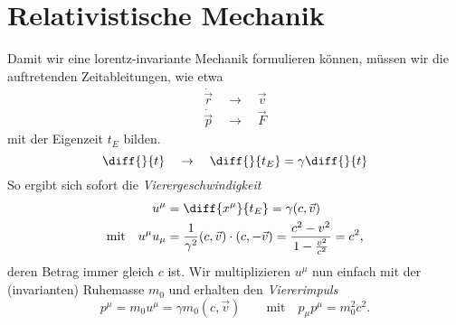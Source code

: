 \section{Relativistische Mechanik}

Damit wir eine lorentz-invariante Mechanik formulieren können, müssen wir die auftretenden Zeitableitungen, wie etwa
\begin{align*}
\dot{\vec{r}} \quad \rightarrow \quad \vec{v}\\
\dot{\vec{p}}\quad\rightarrow\quad\vec{F}
\end{align*}
mit der Eigenzeit $t_E$ bilden. 
\begin{equation*}
\diff{}{t}\quad\rightarrow\quad\diff{}{t_E}=\gamma\diff{}{t}
\end{equation*}
So ergibt sich sofort die \emph{Vierergeschwindigkeit}
\begin{align*}
u^\mu &= \diff{x^\mu}{t_E} = \gamma(c,\vec{v})\\
\text{mit}\quad u^\mu u_\mu &= \frac{1}{\gamma^2}(c,\vec{v})\cdot (c,-\vec{v}) = \frac{c^2-v^2}{1-\frac{v^2}{c^2}} = c^2,
\end{align*}
deren Betrag immer gleich $c$ ist. Wir multiplizieren $u^\mu$ nun einfach mit der (invarianten) Ruhemasse $m_0$ und erhalten den \emph{Viererimpuls}
\begin{equation*}
p^\mu = m_0 u^\mu = \gamma m_0 \left(c,\vec{v}\right)\qquad\text{mit}\quad p_\mu p^\mu = m_0^2c^2.
\end{equation*}

